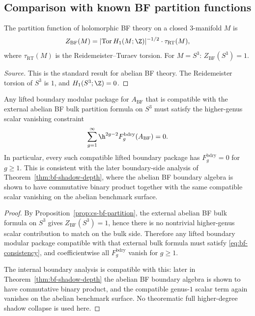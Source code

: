 \subsection{Comparison with known BF partition functions}

\begin{proposition}
\label{prop:cs-bf-partition}
The partition function of holomorphic BF theory on a closed $3$-manifold $M$ is
\begin{equation}
Z_{\mathrm{BF}}(M) = |\mathrm{Tor}\, H_1(M; \Z)|^{-1/2} \cdot
\tau_{\mathrm{RT}}(M),
\end{equation}
where $\tau_{\mathrm{RT}}(M)$ is the Reidemeister--Turaev torsion. For $M = S^3$:
$Z_{\mathrm{BF}}(S^3) = 1$.
\end{proposition}

\begin{proof}[Source]
This is the standard result for abelian BF theory. The Reidemeister torsion of $S^3$
is $1$, and $H_1(S^3; \Z) = 0$.
\end{proof}

\begin{theorem}
\label{thm:bf-boundary-bulk-consistency}
Any lifted boundary modular package for $A_{\mathrm{BF}}$ that is compatible with
the external abelian BF bulk partition formula on $S^3$ must satisfy the
higher-genus scalar vanishing constraint
\begin{equation}
\label{eq:bf-consistency}
\sum_{g=1}^{\infty} \h^{2g-2} F_g^{\mathrm{bdry}}(A_{\mathrm{BF}}) = 0.
\end{equation}
In particular, every such compatible lifted boundary package has
$F_g^{\mathrm{bdry}} = 0$ for $g \geq 1$. This is consistent with the later
boundary-side analysis of Theorem~\ref{thm:bf-shadow-depth}, where the abelian BF
boundary algebra is shown to have commutative binary product together with the
same compatible scalar vanishing on the abelian benchmark surface.
\end{theorem}

\begin{proof}
By Proposition~\ref{prop:cs-bf-partition}, the external abelian BF bulk formula on
$S^3$ gives $Z_{\mathrm{BF}}(S^3)=1$, hence there is no nontrivial higher-genus scalar
contribution to match on the bulk side. Therefore any lifted boundary modular
package compatible with that external bulk formula must satisfy
\eqref{eq:bf-consistency}, and coefficientwise all
$F_g^{\mathrm{bdry}}$ vanish for $g\geq 1$.

The internal boundary analysis is compatible with this: later in
Theorem~\ref{thm:bf-shadow-depth} the abelian BF boundary algebra is shown to have
commutative binary product, and the compatible genus-$1$ scalar term again
vanishes on the abelian benchmark surface. No theorematic full higher-degree
shadow collapse is used here.
\end{proof}


